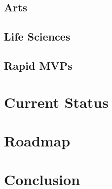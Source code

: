 \documentclass[12pt]{article}
\begin{document}
\subsection{Arts}
\subsection{Life Sciences}
\subsection{Rapid MVPs}
\section{Current Status}
\section{Roadmap}
\section{Conclusion}
\end{document}
